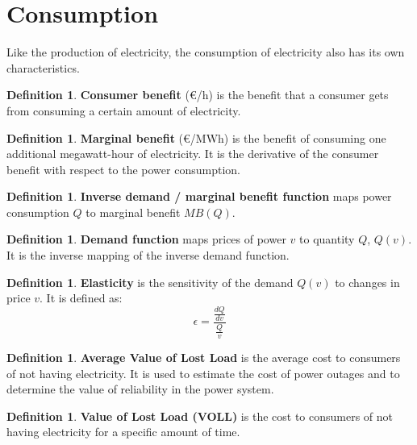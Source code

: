 \documentclass[12pt, openany]{report}
\theoremstyle{definition}
\newtheorem{definition}[thm]{Definition}
\begin{document}
\section{Consumption}
Like the production of electricity, the consumption of electricity also has its own characteristics.
\begin{definition}
    \textbf{Consumer benefit} (€/h) is the benefit that a consumer gets from consuming a certain amount of electricity. 
\end{definition}
\begin{definition}
    \textbf{Marginal benefit} (€/MWh) is the benefit of consuming one additional megawatt-hour of electricity. It is the derivative of the consumer benefit with respect to the power consumption.
\end{definition}
\begin{definition}
    \textbf{Inverse demand / marginal benefit function} maps power consumption $Q$ to marginal benefit $MB(Q)$. 
\end{definition}
\begin{definition}
    \textbf{Demand function} maps prices of power $v$ to quantity $Q$, $Q(v)$. It is the inverse mapping of the inverse demand function.
\end{definition}
\begin{definition}
    \textbf{Elasticity} is the sensitivity of the demand $Q(v)$ to changes in price $v$. It is defined as:
    \begin{equation}
        \epsilon = \frac{\frac{dQ}{dv}}{\frac{Q}{v}}
    \end{equation}
\end{definition}
\begin{definition}
    \textbf{Average Value of Lost Load} is the average cost to consumers of not having electricity. It is used to estimate the cost of power outages and to determine the value of reliability in the power system.
\end{definition}
\begin{definition}
    \textbf{Value of Lost Load (VOLL)} is the cost to consumers of not having electricity for a specific amount of time. 
\end{definition}
\end{document}
